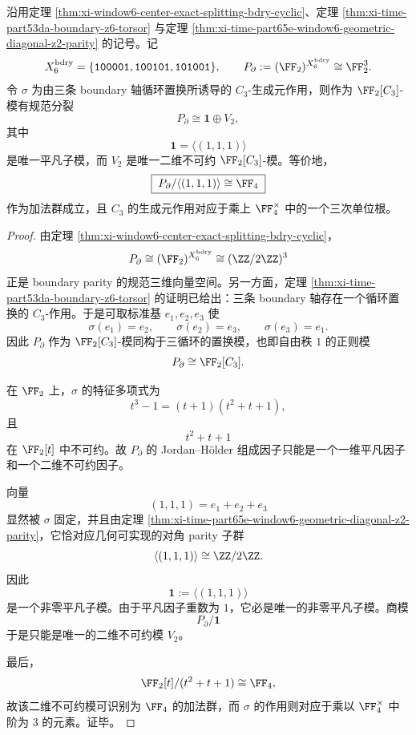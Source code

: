 \begin{theorem}\label{thm:xi-window6-boundary-parity-c3-module-splitting}
沿用定理 \ref{thm:xi-window6-center-exact-splitting-bdry-cyclic}、定理 \ref{thm:xi-time-part53da-boundary-z6-torsor} 与定理 \ref{thm:xi-time-part65e-window6-geometric-diagonal-z2-parity} 的记号。记
\[
X_6^{\mathrm{bdry}}
=
\{\texttt{100001},\texttt{100101},\texttt{101001}\},
\qquad
P_{\partial}:=(\FF_2)^{X_6^{\mathrm{bdry}}}\cong \FF_2^3.
\]
令 \(\sigma\) 为由三条 boundary 轴循环置换所诱导的 \(C_3\)-生成元作用，则作为 \(\FF_2[C_3]\)-模有规范分裂
\[
\boxed{\;
P_{\partial}\cong \mathbf 1\oplus V_2,\;}
\]
其中
\[
\mathbf 1=\langle(1,1,1)\rangle
\]
是唯一平凡子模，而 \(V_2\) 是唯一二维不可约 \(\FF_2[C_3]\)-模。等价地，
\[
\boxed{\;
P_{\partial}/\langle(1,1,1)\rangle\cong \FF_4\;}
\]
作为加法群成立，且 \(C_3\) 的生成元作用对应于乘上 \(\FF_4^\times\) 中的一个三次单位根。
\end{theorem}
\begin{proof}
由定理 \ref{thm:xi-window6-center-exact-splitting-bdry-cyclic}，
\[
P_{\partial}\cong (\FF_2)^{X_6^{\mathrm{bdry}}}
\cong
(\ZZ/2\ZZ)^3
\]
正是 boundary parity 的规范三维向量空间。另一方面，定理 \ref{thm:xi-time-part53da-boundary-z6-torsor} 的证明已给出：三条 boundary 轴存在一个循环置换的 \(C_3\)-作用。于是可取标准基 \(e_1,e_2,e_3\) 使
\[
\sigma(e_1)=e_2,\qquad \sigma(e_2)=e_3,\qquad \sigma(e_3)=e_1.
\]
因此 \(P_{\partial}\) 作为 \(\FF_2[C_3]\)-模同构于三循环的置换模，也即自由秩 \(1\) 的正则模
\[
P_{\partial}\cong \FF_2[C_3].
\]

在 \(\FF_2\) 上，\(\sigma\) 的特征多项式为
\[
t^3-1=(t+1)(t^2+t+1),
\]
且
\[
t^2+t+1
\]
在 \(\FF_2[t]\) 中不可约。故 \(P_{\partial}\) 的 Jordan--H\"older 组成因子只能是一个一维平凡因子和一个二维不可约因子。

向量
\[
(1,1,1)=e_1+e_2+e_3
\]
显然被 \(\sigma\) 固定，并且由定理 \ref{thm:xi-time-part65e-window6-geometric-diagonal-z2-parity}，它恰对应几何可实现的对角 parity 子群
\[
\langle(1,1,1)\rangle\cong \ZZ/2\ZZ.
\]
因此
\[
\mathbf 1:=\langle(1,1,1)\rangle
\]
是一个非零平凡子模。由于平凡因子重数为 \(1\)，它必是唯一的非零平凡子模。商模
\[
P_{\partial}/\mathbf 1
\]
于是只能是唯一的二维不可约模 \(V_2\)。

最后，
\[
\FF_2[t]/(t^2+t+1)\cong \FF_4,
\]
故该二维不可约模可识别为 \(\FF_4\) 的加法群，而 \(\sigma\) 的作用则对应于乘以 \(\FF_4^\times\) 中阶为 \(3\) 的元素。证毕。
\end{proof}

